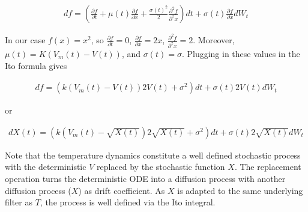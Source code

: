 \begin{align*}
d f = (\frac{\partial f}{ \partial t} + \mu(t)\frac{\partial f}{ \partial x} + \frac{\sigma(t)^{2}}{2}\frac{\partial^{2} f}{ \partial^{2} x})dt + \sigma(t)\frac{\partial f}{ \partial x}dW_{t}
\end{align*}

In our case $f(x) = x^{2}$, so $\frac{\partial f}{ \partial t} = 0$, $\frac{\partial f}{ \partial x} = 2x$, $\frac{\partial^{2} f}{ \partial^{2} x} = 2$. Moreover, $\mu(t) = K(V_{m}(t)-V(t))$, and $\sigma(t)=\sigma$.
Plugging in these values in the Ito formula gives 

\begin{align*}
d f = ( k(V_{m}(t)-V(t))2V(t) + \sigma^{2})dt + \sigma(t)2V(t)dW_{t}
\end{align*}

or

\begin{align*}
d X(t)= ( k(V_{m}(t)-\sqrt{X(t)})2\sqrt{X(t)} + \sigma^{2})dt + \sigma(t)2\sqrt{X(t)}dW_{t}
\end{align*}

Note that the temperature dynamics constitute a well defined stochastic process with the deterministic $V$  replaced by the stochastic function $X$. The replacement operation turns the deterministic ODE into a diffusion process with another diffusion process ($X$) as drift coefficient. As $X$ is adapted to the same underlying filter as $T$, the process is well defined via the Ito integral. 

